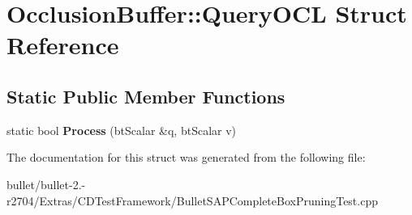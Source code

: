 \hypertarget{struct_occlusion_buffer_1_1_query_o_c_l}{\section{Occlusion\+Buffer\+:\+:Query\+O\+C\+L Struct Reference}
\label{struct_occlusion_buffer_1_1_query_o_c_l}
}
\subsection*{Static Public Member Functions}
\begin{DoxyCompactItemize}
\item 
\hypertarget{struct_occlusion_buffer_1_1_query_o_c_l_a6318e2d614d16e89abd381333997d69b}{static bool {\bfseries Process} (bt\+Scalar \&q, bt\+Scalar v)}\label{struct_occlusion_buffer_1_1_query_o_c_l_a6318e2d614d16e89abd381333997d69b}

\end{DoxyCompactItemize}


The documentation for this struct was generated from the following file\+:\begin{DoxyCompactItemize}
\item 
bullet/bullet-\/2.-\/r2704/\+Extras/\+C\+D\+Test\+Framework/Bullet\+S\+A\+P\+Complete\+Box\+Pruning\+Test.\+cpp\end{DoxyCompactItemize}
